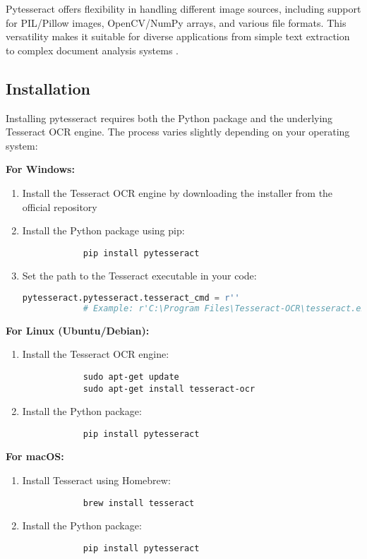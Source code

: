 \documentclass{article}
\begin{document}
	Pytesseract offers flexibility in handling different image sources, including support for PIL/Pillow images, OpenCV/NumPy arrays, and various file formats. This versatility makes it suitable for diverse applications from simple text extraction to complex document analysis systems \cite {Betterpath:2023, DataCamp:2024}.
	
	\subsection{Installation}
	Installing pytesseract requires both the Python package and the underlying Tesseract OCR engine. The process varies slightly depending on your operating system:
	
	\textbf{For Windows:}
	\begin{enumerate}
		\item Install the Tesseract OCR engine by downloading the installer from the official repository
		\item Install the Python package using pip:
		\begin{lstlisting}
			pip install pytesseract
		\end{lstlisting}
		\item Set the path to the Tesseract executable in your code:
		\begin{lstlisting}[language=Python]
			pytesseract.pytesseract.tesseract_cmd = r''
			# Example: r'C:\Program Files\Tesseract-OCR\tesseract.exe'
		\end{lstlisting}
	\end{enumerate}
	
	\textbf{For Linux (Ubuntu/Debian):}
	\begin{enumerate}
		\item Install the Tesseract OCR engine:
		\begin{lstlisting}
			sudo apt-get update
			sudo apt-get install tesseract-ocr
		\end{lstlisting}
		\item Install the Python package:
		\begin{lstlisting}
			pip install pytesseract
		\end{lstlisting}
	\end{enumerate}
	
	\textbf{For macOS:}
	\begin{enumerate}
		\item Install Tesseract using Homebrew:
		\begin{lstlisting}
			brew install tesseract
		\end{lstlisting}
		\item Install the Python package:
		\begin{lstlisting}
			pip install pytesseract
		\end{lstlisting}
	\end{enumerate}
	
\end{document}
